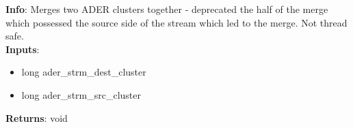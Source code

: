 \textbf{Info}: Merges two ADER clusters together - deprecated the half
of the merge which possessed the source side of the stream which led to
the merge. Not thread safe.\\

\noindent \textbf{Inputs}:
\begin{itemize}
\item{long ader\_strm\_dest\_cluster}
\item{long ader\_strm\_src\_cluster}
\end{itemize}

\noindent \textbf{Returns}: void
